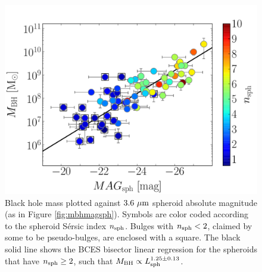 \documentclass[preprint2]{emulateapj}
\begin{document}
\begin{figure}[h]
\begin{center}
\includegraphics[width=\columnwidth]{images/mbh_vs_mag_sph_psb.pdf}
\caption{Black hole mass plotted against $3.6\rm~\mu m$ spheroid absolute magnitude (as in Figure \ref{fig:mbhmagsph}). 
Symbols are color coded according to the spheroid S\'ersic index $n_{\rm sph}$. 
Bulges with $n_{\rm sph}<2$, claimed by some to be pseudo-bulges, are enclosed with a square. 
The black solid line shows the BCES bisector linear regression for the spheroids that have $n_{\rm sph} \geq 2$, 
such that $M_{\rm BH} \propto L_{\rm sph}^{1.25 \pm 0.13}$. }
\label{fig:pseudob}
\end{center}
\end{figure}
\end{document}
